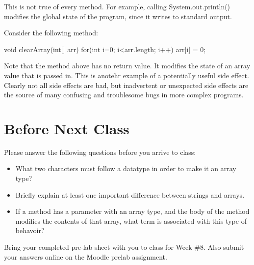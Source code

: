 This is not true of every method. For example, calling System.out.println() modifies the global state of the program, since it writes to standard output. 

Consider the following method:

\begin{code}
void clearArray(int[] arr) {
  for(int i=0; i<arr.length; i++) {
    arr[i] = 0;
  }
}
\end{code}

Note that the method above has no return value. It modifies the state of an array value that is passed in. This is anotehr example of a potentially useful side effect. Clearly not all side effects are bad, but inadvertent or unexpected side effects are the source of many confusing and troublesome bugs in more complex programs. 

\section{Before Next Class}

Please answer the following questions before you arrive to class:

\begin{exer}

\begin{itemize}

\item What two characters must follow a datatype in order to make it an array type?

  \evalline
  
\item Briefly explain at least one important difference between strings and arrays.

  \evalline
  
\item If a method has a parameter with an array type, and the body of the method modifies the contents of that array, what term is associated with this type of behavoir? 

  \evalline
  
\end{itemize}

\end{exer}

Bring your completed pre-lab sheet with you to class for Week \#8. Also submit your answers online on the Moodle prelab assignment.  

